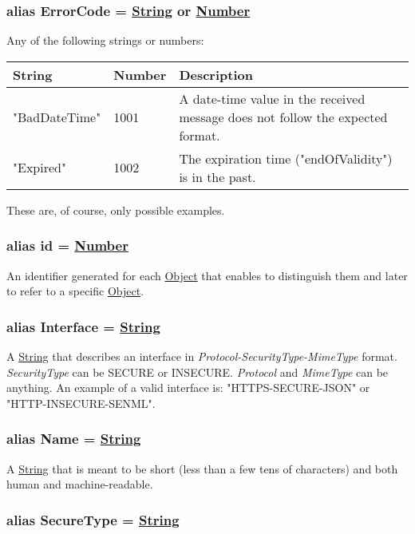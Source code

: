 \documentclass[a4paper]{arrowhead}
\newcommand{\pdef}[1]{{\textcolor{ArrowheadGrey}{#1\label{sec:model:primitives:#1}\label{sec:model:primitives:#1s}}}}
\newcommand{\pref}[1]{{\textcolor{ArrowheadGrey}{\hyperref[sec:model:primitives:#1]{#1}}}}
\begin{document}
\subsubsection{alias \pdef{ErrorCode} = \pref{String} or \pref{Number}}

Any of the following strings or numbers:

\begin{table}[ht!]
\begin{tabularx}{\textwidth}{| p{2.5cm} | p{1.3cm} | X |} \hline
\rowcolor{gray!33} String & Number & Description \\ \hline
"BadDateTime"             & 1001   & A date-time value in the received message does not follow the expected format. \\ \hline
"Expired"                 & 1002   & The expiration time ("endOfValidity") is in the past. \\ \hline
\end{tabularx}
\end{table}

These are, of course, only possible examples.

\subsubsection{alias \pdef{id} = \pref{Number}}

An identifier generated for each \pref{Object} that enables to distinguish them and later to refer to a specific \pref{Object}.

\subsubsection{alias \pdef{Interface} = \pref{String}}

A \pref{String} that describes an interface in \textit{Protocol-SecurityType-MimeType} format. \textit{SecurityType} can be SECURE or INSECURE. \textit{Protocol} and \textit{MimeType} can be anything. An example of a valid interface is: "HTTPS-SECURE-JSON" or "HTTP-INSECURE-SENML".

\subsubsection{alias \pdef{Name} = \pref{String}}

A \pref{String} that is meant to be short (less than a few tens of characters) and both human and machine-readable.

\subsubsection{alias \pdef{SecureType} = \pref{String}}
\end{document}

